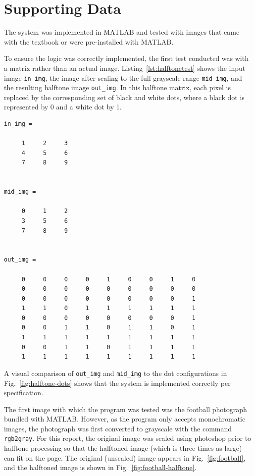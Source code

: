 \documentclass[11pt]{article}
\begin{document}
\section{Supporting Data}
\label{sec:data}

The system was implemented in MATLAB and tested with images that came with the textbook or were pre-installed with MATLAB.

To ensure the logic was correctly implemented, the first test conducted was with a matrix rather than an actual image. Listing~\ref{lst:halftonetest} shows the input image \texttt{in\_img}, the image after scaling to the full grayscale range \texttt{mid\_img}, and the resulting halftone image \texttt{out\_img}. In this halftone matrix, each pixel is replaced by the corresponding set of black and white dots, where a black dot is represented by 0 and a white dot by 1.

\begin{lstlisting}[style=call,label=lst:halftonetest,caption={Testing the Halftoning System}]
in_img =

     1     2     3
     4     5     6
     7     8     9


mid_img =

     0     1     2
     3     5     6
     7     8     9


out_img =

     0     0     0     0     1     0     0     1     0
     0     0     0     0     0     0     0     0     0
     0     0     0     0     0     0     0     0     1
     1     1     0     1     1     1     1     1     1
     0     0     0     0     0     0     0     0     1
     0     0     1     1     0     1     1     0     1
     1     1     1     1     1     1     1     1     1
     0     0     1     1     0     1     1     1     1
     1     1     1     1     1     1     1     1     1
\end{lstlisting}

A visual comparison of \texttt{out\_img} and \texttt{mid\_img} to the dot configurations in Fig.~\ref{fig:halftone-dots} shows that the system is implemented correctly per specification.

The first image with which the program was tested was the football photograph bundled with MATLAB. However, as the program only accepts monochromatic images, the photograph was first converted to grayscale with the command \texttt{rgb2gray}. For this report, the original image was scaled using photoshop prior to halftone processing so that the halftoned image (which is three times as large) can fit on the page. The original (unscaled) image appears in Fig.~\ref{fig:football}, and the halftoned image is shown in Fig.~\ref{fig:football-halftone}.
\end{document}
